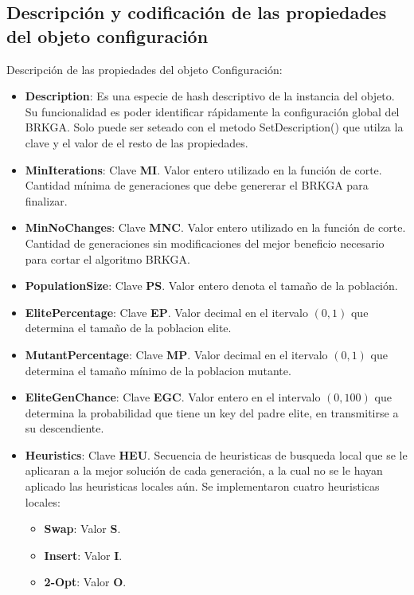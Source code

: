 \bigskip

\subsection{Descripción y codificación de las propiedades del objeto configuración}\label{sec:descrCongif}
Descripción de las propiedades del objeto Configuración:

\begin{itemize}
  \item \textbf{Description}: Es una especie de hash descriptivo de la instancia del objeto. Su funcionalidad es poder identificar rápidamente la configuración global del BRKGA. Solo puede ser seteado con el metodo SetDescription() que utilza la clave y el valor de el resto de las propiedades.
  \item \textbf{MinIterations}: Clave \textbf{MI}. Valor entero utilizado en la función de corte. Cantidad mínima de generaciones que debe genererar el BRKGA para finalizar. 
  \item \textbf{MinNoChanges}: Clave \textbf{MNC}. Valor entero utilizado en la función de corte. Cantidad de generaciones sin modificaciones del mejor beneficio necesario para cortar el algoritmo BRKGA.
  \item \textbf{PopulationSize}: Clave \textbf{PS}. Valor entero denota el tamaño de la población.
  \item \textbf{ElitePercentage}: Clave \textbf{EP}. Valor decimal en el itervalo $(0, 1)$ que determina el tamaño de la poblacion elite. 
  \item \textbf{MutantPercentage}: Clave \textbf{MP}. Valor decimal en el itervalo $(0, 1)$ que determina el tamaño mínimo de la poblacion mutante. 
  \item \textbf{EliteGenChance}: Clave \textbf{EGC}. Valor entero en el intervalo $(0, 100)$ que determina la probabilidad que tiene un key del padre elite, en transmitirse a su descendiente. 
  \item \textbf{Heuristics}: Clave \textbf{HEU}. Secuencia de heuristicas de busqueda local que se le aplicaran a la mejor solución de cada generación, a la cual no se le hayan aplicado las heuristicas locales aún. Se implementaron cuatro heuristicas locales:
	\begin{itemize}
		\item \textbf{Swap}: Valor \textbf{S}.
		\item \textbf{Insert}: Valor \textbf{I}.
		\item \textbf{2-Opt}: Valor \textbf{O}.

\end{itemize}
\end{itemize}
